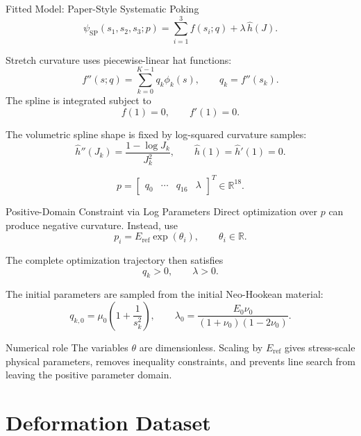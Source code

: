 \documentclass[aspectratio=169,10pt]{beamer}
\newcommand{\eref}{E_{\mathrm{ref}}}
\begin{document}
\begin{frame}{Fitted Model: Paper-Style Systematic Poking}
  \small
  \[
    \psi_{\mathrm{SP}}(s_1,s_2,s_3;p)
    =
    \sum_{i=1}^{3} f(s_i;q)
    +
    \lambda\,\widehat h(J).
  \]

  Stretch curvature uses piecewise-linear hat functions:
  \[
    f''(s;q)=\sum_{k=0}^{K-1}q_k\phi_k(s),
    \qquad q_k=f''(s_k).
  \]
  The spline is integrated subject to
  \[
    f(1)=0,\qquad f'(1)=0.
  \]

  The volumetric spline shape is fixed by log-squared curvature samples:
  \[
    \widehat h''(J_k)
    =
    \frac{1-\log J_k}{J_k^2},
    \qquad
    \widehat h(1)=\widehat h'(1)=0.
  \]

  \[
    p=
    \begin{bmatrix}
      q_0&\cdots&q_{16}&\lambda
    \end{bmatrix}^{T}\in\mathbb R^{18}.
  \]
\end{frame}

\begin{frame}{Positive-Domain Constraint via Log Parameters}
  \small
  Direct optimization over $p$ can produce negative curvature. Instead, use
  \[
    p_i=\eref\exp(\theta_i),
    \qquad \theta_i\in\mathbb R.
  \]

  The complete optimization trajectory then satisfies
  \[
    q_k>0,\qquad \lambda>0.
  \]

  The initial parameters are sampled from the initial Neo-Hookean material:
  \[
    q_{k,0}
    =
    \mu_0\left(1+\frac{1}{s_k^2}\right),
    \qquad
    \lambda_0
    =
    \frac{E_0\nu_0}{(1+\nu_0)(1-2\nu_0)}.
  \]

  \begin{alertblock}{Numerical role}
    The variables $\theta$ are dimensionless. Scaling by $\eref$ gives
    stress-scale physical parameters, removes inequality constraints, and
    prevents line search from leaving the positive parameter domain.
  \end{alertblock}
\end{frame}

\section{Deformation Dataset}
\end{document}
